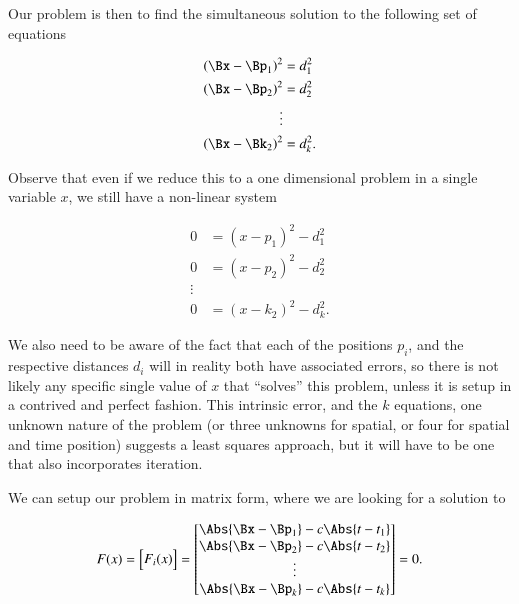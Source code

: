 Our problem is then to find the simultaneous solution to the following set of equations

\begin{equation}\label{eqn:relativisticElectrodynamicsA1:300}
\begin{aligned}
(\Bx - \Bp_1)^2 &= d_1^2 \\
(\Bx - \Bp_2)^2 &= d_2^2 \\
\vdots \\
(\Bx - \Bk_2)^2 &= d_k^2.
\end{aligned}
\end{equation}

Observe that even if we reduce this to a one dimensional problem in a single variable $x$, we still have a non-linear system

\begin{equation}\label{eqn:relativisticElectrodynamicsA1:300b}
\begin{aligned}
0 &= (x - p_1)^2 - d_1^2 \\
0 &= (x - p_2)^2 - d_2^2 \\
\vdots \\
0 &= (x - k_2)^2 - d_k^2.
\end{aligned}
\end{equation}

We also need to be aware of the fact that each of the positions $p_i$, and the respective distances $d_i$ will in reality both have associated errors, so there is not likely any specific single value of $x$ that ``solves'' this problem, unless it is setup in a contrived and perfect fashion.  This intrinsic error, and the $k$ equations, one unknown nature of the problem (or three unknowns for spatial, or four for spatial and time position) suggests a least squares approach, but it will have to be one that also incorporates iteration.

We can setup our problem in matrix form, where we are looking for a solution to 

\begin{equation}\label{eqn:relativisticElectrodynamicsA1:310}
F(x) = 
\begin{bmatrix}
F_i(x)
\end{bmatrix}
=
\begin{bmatrix}
\Abs{\Bx - \Bp_1} - c \Abs{ t - t_1 } \\
\Abs{\Bx - \Bp_2} - c \Abs{ t - t_2 } \\
\vdots \\
\Abs{\Bx - \Bp_k} - c \Abs{ t - t_k } \\
\end{bmatrix}
= 0.
\end{equation}

